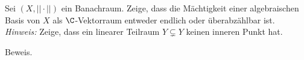 \begin{exercise}
Sei $(X,||\cdot||)$ ein Banachraum. Zeige, dass die Mächtigkeit einer algebraischen
Basis von $X$ als $\C$-Vektorraum entweder endlich oder überabzählbar ist. \\
\textit{Hinweis:} Zeige, dass ein linearer Teilraum $Y \subsetneq Y$ keinen inneren Punkt hat.
\end{exercise}
\begin{solution}
Beweis.
\end{solution}
